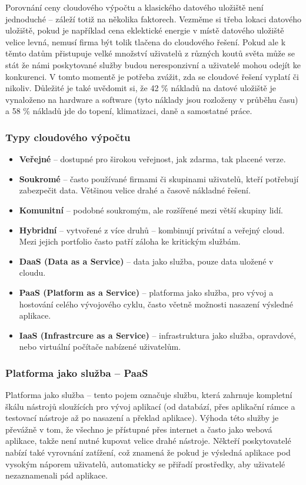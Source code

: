 \par Porovnání ceny cloudového výpočtu a klasického datového uložiště není jednoduché -- záleží totiž na několika faktorech. Vezměme si třeba lokaci datového uložiště, pokud je například cena eklektické energie v místě datového uložiště velice levná, nemusí firma být tolik tlačena do cloudového řešení. Pokud ale k těmto datům přistupuje velké množství uživatelů z různých koutů světa může se stát že námi poskytované služby budou neresponzivní a uživatelé mohou odejít ke konkurenci. V tomto momentě je potřeba zvážit, zda se cloudové řešení vyplatí či nikoliv. Důležité je také uvědomit si, že 42 \% nákladů na datové uložiště je vynaloženo na hardware a software (tyto náklady jsou rozloženy v průběhu času) a 58 \% nákladů jde do topení, klimatizaci, daně a samostatné práce. \cite{cloud-computing-dummies}

\subsubsection{Typy cloudového výpočtu}
\begin{itemize}
\item \textbf{Veřejné} -- dostupné pro širokou veřejnost, jak zdarma, tak placené verze.
\item \textbf{Soukromé} -- často používané firmami či skupinami uživatelů, kteří potřebují zabezpečit data. Většinou velice drahé a časově nákladné řešení.
\item \textbf{Komunitní} -- podobné soukromým, ale rozšířené mezi větší skupiny lidí.
\item \textbf{Hybridní} -- vytvořené z více druhů -- kombinují privátní a veřejný cloud. Mezi jejich portfolio často patří záloha ke kritickým službám.
\item \textbf{DaaS (Data as a Service)} -- data jako služba, pouze data uložené v cloudu.
\item \textbf{PaaS (Platform as a Service)} -- platforma jako služba, pro vývoj a hostování celého vývojového cyklu, často včetně možnosti nasazení výsledné aplikace.
\item \textbf{IaaS (Infrastrcure as a Service)} -- infrastruktura jako služba, opravdové, nebo virtuální počítače nabízené uživatelům. \cite{cloud-computing} \label{IaaS}
\end{itemize}

\subsubsection{Platforma jako služba -- PaaS}
Platforma jako služba -- tento pojem označuje službu, která zahrnuje kompletní škálu nástrojů sloužících pro vývoj aplikací (od databází, přes aplikační rámce a testovací nástroje až po nasazení a překlad aplikace). Výhoda této služby je převážně v tom, že všechno je přístupné přes internet a často jako webová aplikace, takže není nutné kupovat velice drahé nástroje. Někteří poskytovatelé nabízí také vyrovnání zatížení, což znamená že pokud je výsledná aplikace pod vysokým náporem uživatelů, automaticky se přiřadí prostředky, aby uživatelé nezaznamenali pád aplikace. \cite{essentials-cloud}

